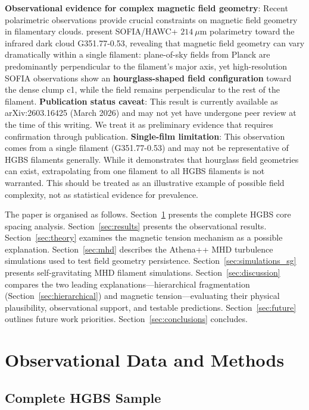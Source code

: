 \documentclass[11pt,a4paper]{article}
\begin{document}
\textbf{Observational evidence for complex magnetic field geometry}: Recent polarimetric observations provide crucial constraints on magnetic field geometry in filamentary clouds. \citet{Jadhav2026} present SOFIA/HAWC+ $214~\mu$m polarimetry toward the infrared dark cloud G351.77-0.53, revealing that magnetic field geometry can vary dramatically within a single filament: plane-of-sky fields from Planck are predominantly perpendicular to the filament's major axis, yet high-resolution SOFIA observations show an \textbf{hourglass-shaped field configuration} toward the dense clump c1, while the field remains perpendicular to the rest of the filament. \textbf{Publication status caveat}: This result is currently available as arXiv:2603.16425 (March 2026) and may not yet have undergone peer review at the time of this writing. We treat it as preliminary evidence that requires confirmation through publication. \textbf{Single-film limitation}: This observation comes from a single filament (G351.77-0.53) and may not be representative of HGBS filaments generally. While it demonstrates that hourglass field geometries can exist, extrapolating from one filament to all HGBS filaments is not warranted. This should be treated as an illustrative example of possible field complexity, not as statistical evidence for prevalence.

The paper is organised as follows. Section~\ref{sec:observations} presents the complete HGBS core spacing analysis. Section~\ref{sec:results} presents the observational results. Section~\ref{sec:theory} examines the magnetic tension mechanism as a possible explanation. Section~\ref{sec:mhd} describes the Athena++ MHD turbulence simulations used to test field geometry persistence. Section~\ref{sec:simulations_sg} presents self-gravitating MHD filament simulations. Section~\ref{sec:discussion} compares the two leading explanations—hierarchical fragmentation (Section~\ref{sec:hierarchical}) and magnetic tension—evaluating their physical plausibility, observational support, and testable predictions. Section~\ref{sec:future} outlines future work priorities. Section~\ref{sec:conclusions} concludes.

\section{Observational Data and Methods}
\label{sec:observations}

\subsection{Complete HGBS Sample}
\end{document}
